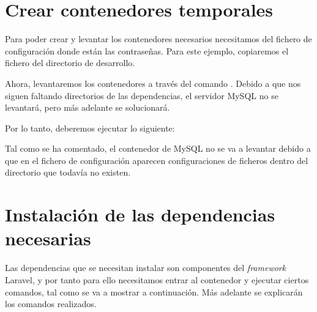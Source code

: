 \section{Crear contenedores temporales}

Para poder crear y levantar los contenedores necesarios necesitamos del fichero de configuración donde están las contraseñas. Para este ejemplo, copiaremos el fichero  del directorio de desarrollo.


Ahora, levantaremos los contenedores a través del comando . Debido a que nos siguen faltando directorios de las dependencias, el servidor MySQL no se levantará, pero más adelante se solucionará.

Por lo tanto, deberemos ejecutar lo siguiente:


Tal como se ha comentado, el contenedor de MySQL no se va a levantar debido a que en el fichero de configuración  aparecen configuraciones de ficheros dentro del directorio  que todavía no existen.


\section{Instalación de las dependencias necesarias}

Las dependencias que se necesitan instalar son componentes del \textit{framework} Laravel, y por tanto para ello necesitamos entrar al contenedor y ejecutar ciertos comandos, tal como se va a mostrar a continuación. Más adelante se explicarán los comandos realizados.

